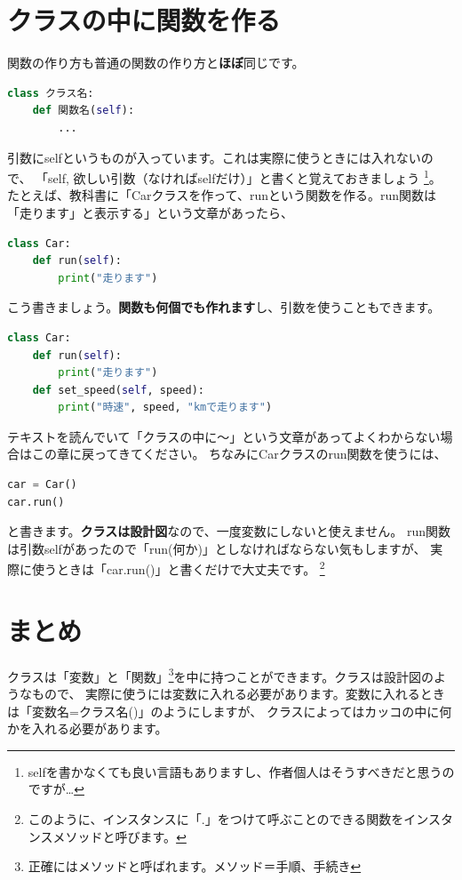 \documentclass[12pt, a4paper, dvipdfmx]{book}
\begin{document}
\newpage
\section{クラスの中に関数を作る}
関数の作り方も普通の関数の作り方と\textbf{ほぼ}同じです。
\begin{lstlisting}[caption=クラスの中に関数を作る,label=sample, language=Python]
class クラス名:
    def 関数名(self):
        ...
\end{lstlisting}
引数にselfというものが入っています。これは実際に使うときには入れないので、
「self, 欲しい引数（なければselfだけ）」と書くと覚えておきましょう
\footnote{selfを書かなくても良い言語もありますし、作者個人はそうすべきだと思うのですが…}。
たとえば、教科書に「Carクラスを作って、runという関数を作る。run関数は「走ります」と表示する」という文章があったら、
\begin{lstlisting}[caption=Carクラスの作り方,label=sample, language=Python]
class Car:
    def run(self):
        print("走ります")
\end{lstlisting}
こう書きましょう。\textbf{関数も何個でも作れます}し、引数を使うこともできます。
\begin{lstlisting}[caption=引数を使う場合,label=sample, language=Python]
class Car:
    def run(self):
        print("走ります")
    def set_speed(self, speed):
        print("時速", speed, "kmで走ります")
\end{lstlisting}
テキストを読んでいて「クラスの中に〜」という文章があってよくわからない場合はこの章に戻ってきてください。
ちなみにCarクラスのrun関数を使うには、
\begin{lstlisting}[caption=Carクラスの使い方,label=sample, language=Python]
car = Car()
car.run()
\end{lstlisting}
と書きます。\textbf{クラスは設計図}なので、一度変数にしないと使えません。
run関数は引数selfがあったので「run(何か)」としなければならない気もしますが、
実際に使うときは「car.run()」と書くだけで大丈夫です。
\footnote{このように、インスタンスに「.」をつけて呼ぶことのできる関数をインスタンスメソッドと呼びます。}

\section{まとめ}
クラスは「変数」と「関数」\footnote{正確にはメソッドと呼ばれます。メソッド＝手順、手続き}を中に持つことができます。クラスは設計図のようなもので、
実際に使うには変数に入れる必要があります。変数に入れるときは「変数名=クラス名()」のようにしますが、
クラスによってはカッコの中に何かを入れる必要があります。
\end{document}
